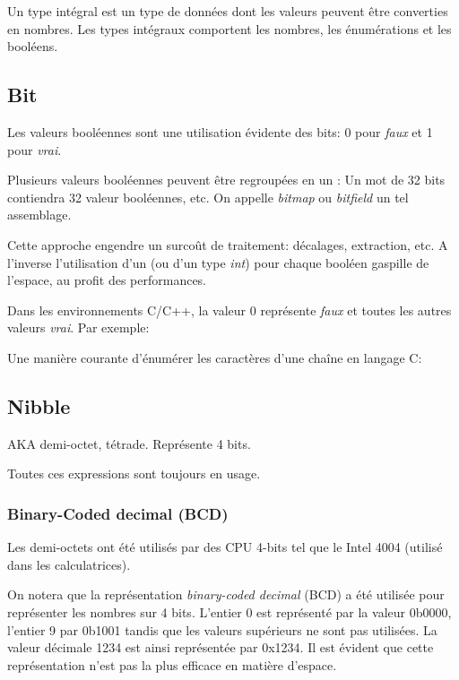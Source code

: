 ﻿%

Un type intégral est un type de données dont les valeurs peuvent être converties en nombres.
Les types intégraux comportent les nombres, les énumérations et les booléens.

\subsection{Bit}

Les valeurs booléennes sont une utilisation évidente des bits: 0 pour \emph{faux} et 1 pour \emph{vrai}.

Plusieurs valeurs booléennes peuvent être regroupées en un : Un mot de 32 bits contiendra 32 valeur booléennes, etc.
On appelle \emph{bitmap} ou \emph{bitfield} un tel assemblage.

Cette approche engendre un surcoût de traitement: décalages, extraction, etc.
A l'inverse l'utilisation d'un  (ou d'un type \emph{int}) pour chaque booléen gaspille de l'espace, au profit des performances.

Dans les environnements C/C++, la valeur 0 représente \emph{faux} et toutes les autres valeurs \emph{vrai}.
Par exemple:



Une manière courante d'énumérer les caractères d'une chaîne en langage C:



\subsection{Nibble}

\ac{AKA} demi-octet, tétrade.
Représente 4 bits.

Toutes ces expressions sont toujours en usage.

\subsubsection{Binary-Coded decimal (\ac{BCD})}
\label{BCD}


Les demi-octets ont été utilisés par des CPU 4-bits tel que le Intel 4004 (utilisé dans les calculatrices).

On notera que la représentation \emph{binary-coded decimal} (\ac{BCD}) a été utilisée pour représenter les nombres sur 4 bits.
L'entier 0 est représenté par la valeur 0b0000, l'entier 9 par 0b1001 tandis que les valeurs supérieurs ne sont pas utilisées.
La valeur décimale 1234 est ainsi représentée par 0x1234.
Il est évident que cette représentation n'est pas la plus efficace en matière d'espace.

